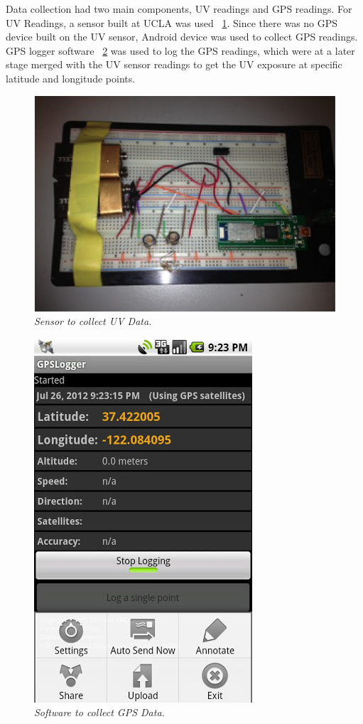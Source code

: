 \documentclass[conference]{IEEETran}
\begin{document}
Data collection had two main components, UV readings and GPS readings. For UV Readings, a sensor built at UCLA was used ~\ref{fig:uvSensor}. Since there was no GPS device built on the UV sensor, Android device was used to collect GPS readings. GPS logger software ~\ref{fig:gpsLogger} was used to log the GPS readings, which were at a later stage merged with the UV sensor readings to get the UV exposure at specific latitude and longitude points. 
\begin{figure}
\begin{center}
\includegraphics[scale=0.55]{uvSensor.png}
\caption{\small \sl Sensor to collect UV Data.\label{fig:uvSensor}}
\end{center}
\end{figure}
\begin{figure}
\begin{center}
\includegraphics[scale=0.55]{gpsLogger.png}
\caption{\small \sl Software to collect GPS Data.\label{fig:gpsLogger}}
\end{center}
\end{figure}
\end{document}
